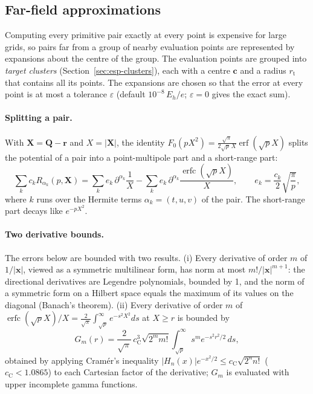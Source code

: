 \documentclass[11pt,a4paper]{article}
\begin{document}
\subsection{Far-field approximations}\label{sec:far-field}
Computing every primitive pair exactly at every point is expensive for
large grids, so pairs far from a group of nearby evaluation points are
represented by expansions about the centre of the group. The evaluation
points are grouped into \emph{target clusters} (Section~\ref{sec:esp-clusters}),
each with a centre $\mathbf c$ and a radius $r_{\mathrm t}$ that contains
all its points. The expansions are chosen so that the error at every point
is at most a tolerance $\varepsilon$ (default $10^{-8}$\,$E_h/e$;
$\varepsilon=0$ gives the exact sum).

\paragraph{Splitting a pair.} With $\mathbf X=\mathbf Q-\mathbf r$ and
$X=|\mathbf X|$, the identity
$F_0(pX^2)=\frac{\sqrt\pi}{2\sqrt p\,X}\operatorname{erf}(\sqrt pX)$ splits
the potential of a pair into a point-multipole part and a short-range part:
\begin{equation}
 \sum_kc_kR_{\alpha_k}(p,\mathbf X)
 =\sum_ke_k\,\partial^{\alpha_k}\frac1X
 -\sum_ke_k\,\partial^{\alpha_k}\frac{\operatorname{erfc}(\sqrt pX)}{X},
 \qquad e_k=\frac{c_k}{2}\sqrt{\frac\pi p},
\end{equation}
where $k$ runs over the Hermite terms $\alpha_k=(t,u,v)$ of the pair. The
short-range part decays like $e^{-pX^2}$.

\paragraph{Two derivative bounds.} The errors below are bounded with two
results. (i) Every derivative of order $m$ of $1/|\mathbf x|$, viewed as a
symmetric multilinear form, has norm at most $m!/|\mathbf x|^{m+1}$: the
directional derivatives are Legendre polynomials, bounded by 1, and the
norm of a symmetric form on a Hilbert space equals the maximum of its
values on the diagonal (Banach's theorem). (ii) Every derivative of order
$m$ of
$\operatorname{erfc}(\sqrt pX)/X=\frac{2}{\sqrt\pi}\int_{\sqrt p}^\infty
e^{-s^2X^2}ds$ at $X\ge r$ is bounded by
\begin{equation}
 G_m(r)=\frac{2}{\sqrt\pi}\,c_{\mathrm C}^3\sqrt{2^mm!}
 \int_{\sqrt p}^\infty s^me^{-s^2r^2/2}\,ds,
\end{equation}
obtained by applying Cram\'er's inequality
$|H_n(x)|e^{-x^2/2}\le c_{\mathrm C}\sqrt{2^nn!}$ ($c_{\mathrm C}<1.0865$)
to each Cartesian factor of the derivative; $G_m$ is evaluated with upper
incomplete gamma functions.
\end{document}
